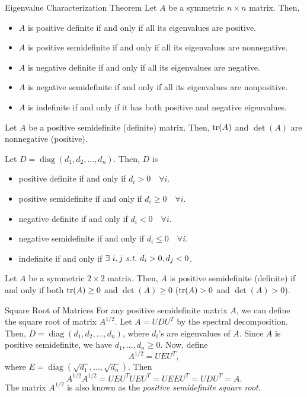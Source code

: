\begin{thm}{Eigenvalue Characterization Theorem}
	Let $A$ be a symmetric $n\times n$ matrix. Then, 
	\begin{itemize}
		\item $A$ is positive definite if and only if all its eigenvalues are positive.
		\item $A$ is positive semidefinite if and only if all its eigenvalues are nonnegative.
		\item $A$ is negative definite if and only if all its eigenvalues are negative.
		\item $A$ is negative semidefinite if and only if all its eigenvalues are nonpositive.
		\item $A$ is indefinite if and only if it has both positive and negative eigenvalues. 
	\end{itemize}	
\end{thm}
\begin{cor}{}
	Let $A$ be a positive semidefinite (definite) matrix. Then, $\tr(A)$ and $\det(A)$ are nonnegative (positive). 
\end{cor}
\begin{lem}
	Let $D=\operatorname{diag}(d_1,d_2,\dots,d_n)$. Then, $D$ is
	\begin{itemize}
		\item positive definite if and only if $d_i>0\quad\forall i$.
		\item positive semidefinite if and only if $d_i\geq0\quad\forall i$.
		\item negative definite if and only if $d_i<0\quad\forall i$.
		\item negative semidefinite if and only if $d_i\leq0\quad\forall i$.
		\item indefinite if and only if $\exists\ i,j\st d_i>0, d_j<0$.
	\end{itemize}
\end{lem}
\begin{prop}{}
	Let $A$ be a symmetric $2\times2$ matrix. Then, $A$ is positive semidefinite (definite) if and only if both $\tr(A)\geq0$ and $\det(A)\geq0$ ($\tr(A)>0$ and $\det(A)>0$).
\end{prop}
\begin{eg}{Square Root of Matrices}
	For any positive semidefinite matrix $A$, we can define the square root of matrix $A^{1/2}$. Let $A=UDU^T$ by the spectral decomposition. Then, $D=\operatorname{diag}(d_1,d_2,\dots,d_n)$, where $d_i$'s are eigenvalues of $A$. Since $A$ is positive semidefinite, we have $d_1,\dots,d_n\geq0$. Now, define \[A^{1/2}=UEU^T,\] where $E=\operatorname{diag}(\sqrt{d_1},\dots,\sqrt{d_n})$. Then \[A^{1/2}A^{1/2}=UEU^TUEU^T=UEEU^T=UDU^T=A.\] The matrix $A^{1/2}$ is also known as the \textit{positive semidefinite square root}.
\end{eg}
